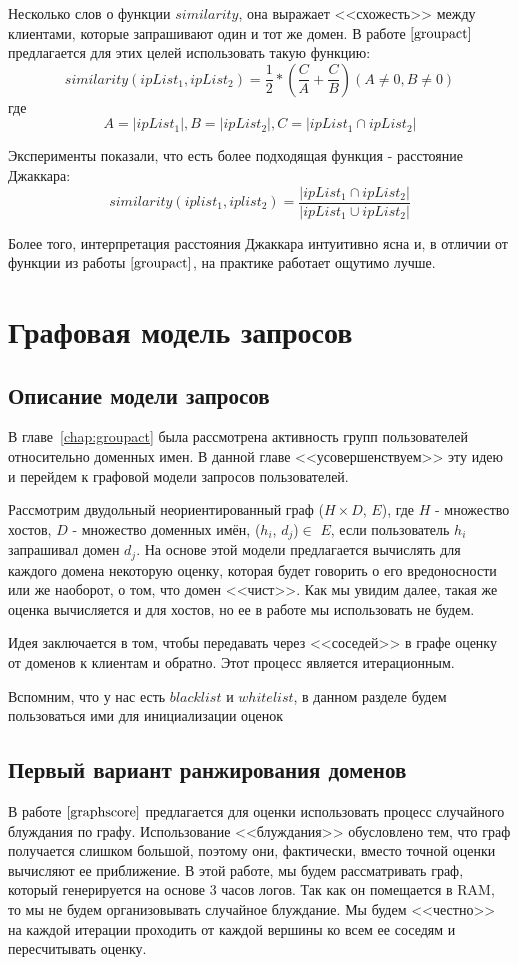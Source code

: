 \documentclass[a4paper,14pt]{extreport} %
\begin{document}
	
Несколько слов о функции $similarity$, она выражает <<схожесть>> между клиентами, которые запрашивают один и тот же домен. В работе $\cite{groupact}$ предлагается для этих целей использовать такую функцию: 
\begin{equation}
	\label{eq:ga-orig}
	similarity(ipList_1, ipList_2) = \frac{1}{2} * (\frac{C}{A} + \frac{C}{B}) (A\ne0, B\ne0)
\end{equation} 
где $$A = |ipList_1|, B = |ipList_2|, C = |ipList_1\cap ipList_2|$$
	
Эксперименты показали, что есть более подходящая функция - расстояние Джаккара: 
\begin{equation}
	\label{eq:ga-jacc}
	similarity(iplist_1, iplist_2) = \frac{|ipList_1\cap ipList_2|}{|ipList_1\cup ipList_2|}
\end{equation} 

Более того, интерпретация расстояния Джаккара интуитивно ясна и, в отличии от функции из работы $\cite{groupact}$, на практике работает ощутимо лучше.
	
\chapter{Графовая модель запросов}
\label{chap:graph}
\section{Описание модели запросов}
В главе~\ref{chap:groupact} была рассмотрена активность групп пользователей относительно доменных имен. В данной главе <<усовершенствуем>> эту идею и перейдем к графовой модели запросов пользователей.
	
Рассмотрим двудольный неориентированный граф ($H\times D$, $E$), где $H$ - множество хостов, $D$ - множество доменных имён, ($h_i$, $d_j$)$\in$ $E$, если пользователь $h_i$ запрашивал домен $d_j$. 
На основе этой модели предлагается вычислять для каждого домена некоторую оценку, которая будет говорить о его вредоносности или же наоборот, о том, что домен <<чист>>. Как мы увидим далее, такая же оценка вычисляется и для хостов, но ее в работе мы использовать не будем.

Идея заключается в том, чтобы передавать через <<соседей>> в графе оценку от доменов к клиентам и обратно. Этот процесс является итерационным.
	
			
Вспомним, что у нас есть $blacklist$ и $whitelist$, в данном разделе будем пользоваться ими для инициализации оценок

\section{Первый вариант ранжирования доменов}
В работе $\cite{graphscore}$ предлагается для оценки использовать процесс случайного блуждания по графу. Использование <<блуждания>> обусловлено тем, что граф получается слишком большой, поэтому они, фактически, вместо точной оценки вычисляют ее приближение. В этой работе, мы будем рассматривать граф, который генерируется на основе 3 часов логов. Так как он помещается в RAM, то мы не будем организовывать случайное блуждание. Мы будем <<честно>> на каждой итерации проходить от каждой вершины ко всем ее соседям и пересчитывать оценку.
\end{document}
